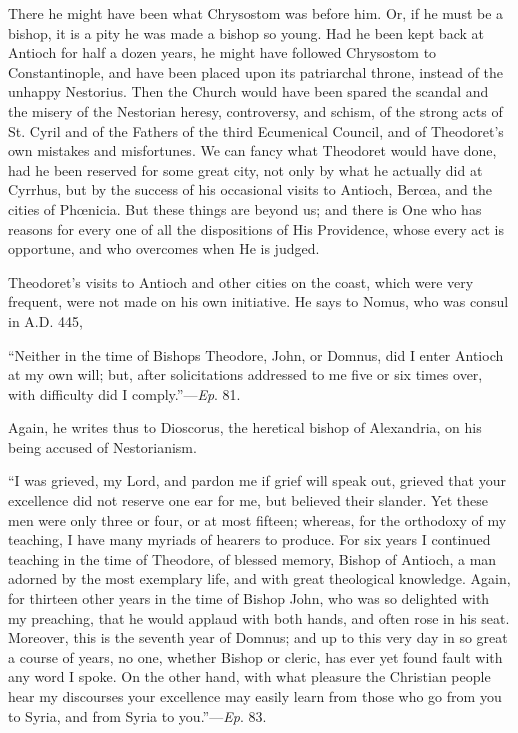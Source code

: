 There he might have been what Chrysostom was before him. Or, if he
must be a bishop, it is a pity he was made a bishop so young. Had he
been kept back at Antioch for half a dozen years, he might have
followed Chrysostom to Constantinople, and have been placed upon its
patriarchal throne, instead of the unhappy Nestorius. Then the Church
would have been spared the scandal and the misery of the Nestorian
heresy, controversy, and schism, of the strong acts of St. Cyril and
of the Fathers of the third Ecumenical Council, and of Theodoret's own
mistakes and misfortunes. We can fancy what Theodoret would have done,
had he been reserved for some great city, not only by what he actually
did at Cyrrhus, but by the success of his occasional visits to
Antioch, Berœa, and the cities of Phœnicia. But these things are
beyond us; and there is One who has reasons for every one of all the
dispositions of His Providence, whose every act is opportune, and who
overcomes when He is judged.

Theodoret's visits to Antioch and other cities on the coast, which
were very frequent, were not made on his own initiative. He says to
Nomus, who was consul in A.D. 445,

``Neither in the time of Bishops Theodore, John, or Domnus, did
I enter Antioch at my own will; but, after solicitations addressed to
me five or six times over, with difficulty did I comply.''—\emph{Ep}.
81.

Again, he writes thus to Dioscorus, the heretical bishop of
Alexandria, on his being accused of Nestorianism.

``I was grieved, my Lord, and pardon me if grief will speak
out, grieved that your excellence did not reserve one ear for me, but
believed their slander. Yet these men were only three or four, or at
most fifteen; whereas, for the orthodoxy of my teaching, I have many
myriads of hearers to produce. For six years I continued teaching in
the time of Theodore, of blessed memory, Bishop of Antioch,
a man adorned by the most exemplary life, and with great theological
knowledge. Again, for thirteen other years in the time of Bishop John,
who was so delighted with my preaching, that he would applaud with
both hands, and often rose in his seat. Moreover, this is the seventh
year of Domnus; and up to this very day in so great a course of years,
no one, whether Bishop or cleric, has ever yet found fault with any
word I spoke. On the other hand, with what pleasure the Christian
people hear my discourses your excellence may easily learn from those
who go from you to Syria, and from Syria to you.''—\emph{Ep}.
83.

